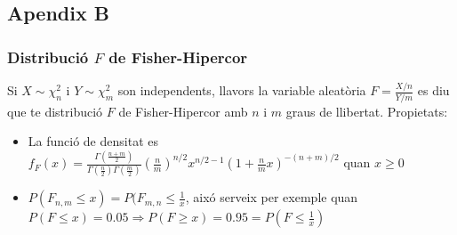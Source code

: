 \documentclass[a4paper]{sciposter}
\begin{document}
\begin{multicols}{3}
\subsection{Apendix B}
\subsubsection{Distribució $F$ de Fisher-Hipercor}
Si $X \sim \chi^2_n$ i $Y \sim \chi^2_m$ son independents, llavors la variable aleatòria $F = \frac{X/n}{Y/m}$ es diu que te distribució $F$ de Fisher-Hipercor amb $n$ i $m$ graus de llibertat.
Propietats:
\begin{itemize}
	\item La funció de densitat es\\ $f_F(x) = \frac{\Gamma(\frac{n+m}{2})}{\Gamma(\frac{n}{2})\Gamma(\frac{m}{2})}(\frac{n}{m})^{n/2}x^{n/2-1}\left(1+\frac{n}{m}x\right)^{-(n+m)/2}$ quan $x\geq 0$
	\item $P(F_{n,m}\leq x) = P(F_{m,n}\leq \frac{1}{x}$, aixó serveix per exemple quan $P(F \leq x) = 0.05 \Rightarrow P(F \geq x) = 0.95 =  P(F \leq \frac{1}{x})$
\end{itemize}
\end{multicols}
\end{document}
